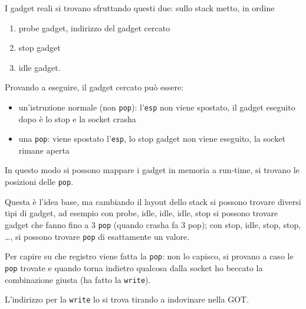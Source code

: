 I gadget reali si trovano sfruttando questi due: sullo stack metto, in ordine
\begin{enumerate}
	\item probe gadget, indirizzo del gadget cercato
	
    \item stop gadget
	
    \item idle gadget. 
\end{enumerate}

Provando a eseguire, il gadget cercato può essere:
\begin{itemize}
	\item un'istruzione normale (non \texttt{pop}): l'\texttt{esp} non viene spostato, il gadget eseguito dopo è lo stop e la socket crasha
    
	\item una \texttt{pop}: viene spostato l'\texttt{esp}, lo stop gadget non viene eseguito, la socket rimane aperta
\end{itemize}

In questo modo si possono mappare i gadget in memoria a run-time, si trovano le posizioni delle \texttt{pop}. 

Questa è l'idea base, ma cambiando il layout dello stack si possono trovare diversi tipi di gadget, ad esempio con probe, idle, idle, idle, stop si possono trovare gadget che fanno fino a 3 \texttt{pop} (quando crasha fa 3 pop); con stop, idle, stop, stop, \dots, si possono trovare \texttt{pop} di esattamente un valore.

Per capire su che registro viene fatta la \texttt{pop}: non lo capisco, si provano a caso le \texttt{pop} trovate e quando torna indietro qualcosa dalla socket ho beccato la combinazione giusta (ha fatto la \texttt{write}).

L'indirizzo per la \texttt{write} lo si trova tirando a indovinare nella GOT.

